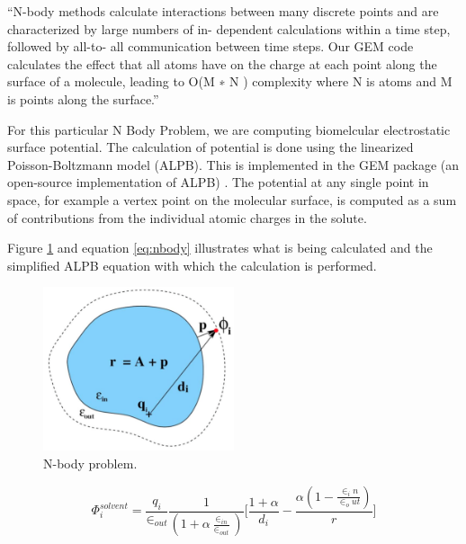 \par{``N-body methods calculate interactions between many discrete points and are characterized 
    by large numbers of in- dependent calculations within a time step, followed by all-to- all 
    communication between time steps. Our GEM code calculates the effect that all atoms have on 
    the charge at each point along the surface of a molecule, leading to O(M ∗ N ) 
    complexity where N is atoms and M is points along the surface.”\cite{dwarfs}}

\par{For this particular N Body Problem, we are computing biomelcular electrostatic 
    surface potential. The calculation of potential is done using the linearized 
    Poisson-Boltzmann model (ALPB). This is implemented in the GEM package 
    (an open-source implementation of ALPB) . The potential at any single point in space, 
    for example a vertex point on the molecular surface, is computed as a sum of contributions 
    from the individual atomic charges in the solute.}

\par{Figure \ref{nbody} and equation \ref{eq:nbody} illustrates what is being calculated and the simplified ALPB equation 
    with which the calculation is performed.}

\begin{figure}[!h]
    \centering
    \includegraphics[width=0.5\textwidth]{figures/nbody.png}
    \caption{N-body problem.}
    \label{nbody}
\end{figure}

\begin{equation} \label{eq:nbody}
    \Phi_i^{solvent} = \frac{q_i}{\in_{out}}\frac{1}{(1+\alpha\frac{\in_{in}}{\in_{out}})}\Bigg[\frac{1+\alpha}{d_i}-\frac{\alpha(1-\frac{\in_in}{\in_out})}{r}\Bigg]
\end{equation}

